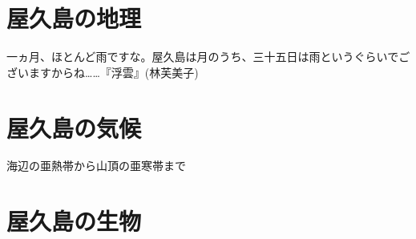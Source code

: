 \documentclass[10pt,titlepage,a5paper]{ltjsbook}
\begin{document}
  \chapter{屋久島の地理}
  \setcounter{page}{1}
  
  \begin{savequote}
    一ヵ月、ほとんど雨ですな。屋久島は月のうち、三十五日は雨というぐらいでございますからね……『浮雲』(林芙美子)
  \end{savequote}
  \chapter{屋久島の気候}
  
  \begin{savequote}
    海辺の亜熱帯から山頂の亜寒帯まで
  \end{savequote}
  \chapter{屋久島の生物}
  
\end{document}
